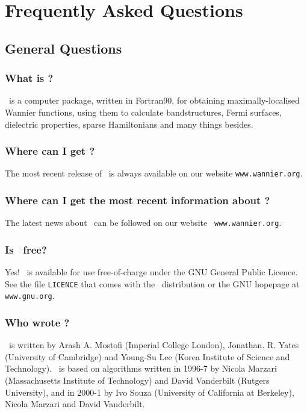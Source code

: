 \chapter{Frequently Asked Questions}\label{chap:faq}


\section{General Questions}

\subsection{What is \wannier?}

\wannier\ is a computer package, written in Fortran90, for obtaining
maximally-localised Wannier functions, using them to calculate
bandstructures, Fermi surfaces, dielectric properties, sparse
Hamiltonians and many things besides.

\subsection{Where can I get \wannier?}

The most recent release of \wannier\ is always available on our
website {\tt www.wannier.org}.

\subsection{Where can I get the most recent information about
  \wannier?}

The latest news about \wannier\ can be followed on our website {\tt
  www.wannier.org}.

\subsection{Is \wannier\ free?}

Yes! \wannier\ is available for use free-of-charge under the GNU
General Public Licence. See the file {\tt LICENCE} that comes with the
\wannier\ distribution or the GNU hopepage at {\tt www.gnu.org}. 

\subsection{Who wrote \wannier?}

\wannier\ is written by Arash A. Mostofi (Imperial College London),
Jonathan. R. Yates (University of Cambridge) and Young-Su Lee (Korea
Institute of Science and Technology). \wannier\ is based on algorithms
written in 1996-7 by Nicola Marzari (Massachusetts Institute of
Technology) and David Vanderbilt (Rutgers University), and in 2000-1
by Ivo Souza (University of California at Berkeley), Nicola Marzari
and David Vanderbilt.

